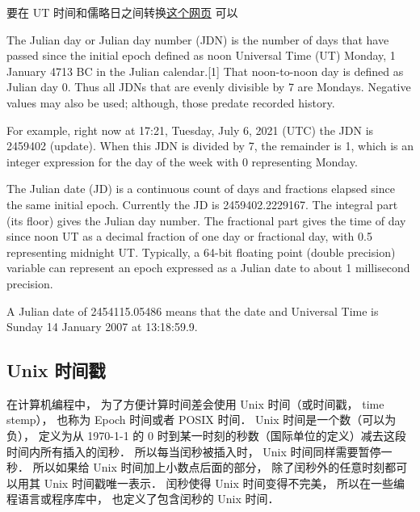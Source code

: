 要在 UT 时间和儒略日之间转换\href{https://www.aavso.org/jd-calculator}{这个网页} 可以
 

The Julian day or Julian day number (JDN) is the number of days that have passed since the initial epoch defined as noon Universal Time (UT) Monday, 1 January 4713 BC in the Julian calendar.[1] That noon-to-noon day is defined as Julian day 0. Thus all JDNs that are evenly divisible by 7 are Mondays. Negative values may also be used; although, those predate recorded history.

For example, right now at 17:21, Tuesday, July 6, 2021 (UTC) the JDN is 2459402 (update). When this JDN is divided by 7, the remainder is 1, which is an integer expression for the day of the week with 0 representing Monday.

The Julian date (JD) is a continuous count of days and fractions elapsed since the same initial epoch. Currently the JD is 2459402.2229167. The integral part (its floor) gives the Julian day number. The fractional part gives the time of day since noon UT as a decimal fraction of one day or fractional day, with 0.5 representing midnight UT. Typically, a 64-bit floating point (double precision) variable can represent an epoch expressed as a Julian date to about 1 millisecond precision.

A Julian date of 2454115.05486 means that the date and Universal Time is Sunday 14 January 2007 at 13:18:59.9.

\subsection{Unix 时间戳}
在计算机编程中， 为了方便计算时间差会使用 Unix 时间（或时间戳， time stemp）， 也称为 Epoch 时间或者 POSIX 时间． Unix 时间是一个数（可以为负）， 定义为从 1970-1-1 的 0 时到某一时刻的秒数（国际单位的定义）减去这段时间内所有插入的闰秒． 所以每当闰秒被插入时， Unix 时间同样需要暂停一秒． 所以如果给 Unix 时间加上小数点后面的部分， 除了闰秒外的任意时刻都可以用其 Unix 时间戳唯一表示． 闰秒使得 Unix 时间变得不完美， 所以在一些编程语言或程序库中， 也定义了包含闰秒的 Unix 时间．

